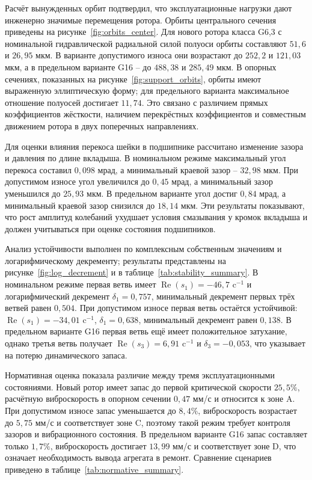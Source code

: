 Расчёт вынужденных орбит подтвердил, что эксплуатационные нагрузки дают инженерно значимые перемещения ротора. Орбиты центрального сечения приведены на рисунке~\ref{fig:orbits_center}. Для нового ротора класса G6,3 с номинальной гидравлической радиальной силой полуоси орбиты составляют $51{,}6$ и $26{,}95$ мкм. В варианте допустимого износа они возрастают до $252{,}2$ и $121{,}03$ мкм, а в предельном варианте G16 -- до $488{,}38$ и $285{,}49$ мкм. В опорных сечениях, показанных на рисунке~\ref{fig:support_orbits}, орбиты имеют выраженную эллиптическую форму; для предельного варианта максимальное отношение полуосей достигает $11{,}74$. Это связано с различием прямых коэффициентов жёсткости, наличием перекрёстных коэффициентов и совместным движением ротора в двух поперечных направлениях.

Для оценки влияния перекоса шейки в подшипнике рассчитано изменение зазора и давления по длине вкладыша. В номинальном режиме максимальный угол перекоса составил $0{,}098$ мрад, а минимальный краевой зазор -- $32{,}98$ мкм. При допустимом износе угол увеличился до $0{,}45$ мрад, а минимальный зазор уменьшился до $25{,}93$ мкм. В предельном варианте угол достиг $0{,}84$ мрад, а минимальный краевой зазор снизился до $18{,}14$ мкм. Эти результаты показывают, что рост амплитуд колебаний ухудшает условия смазывания у кромок вкладыша и должен учитываться при оценке состояния подшипников.

Анализ устойчивости выполнен по комплексным собственным значениям и логарифмическому декременту; результаты представлены на рисунке~\ref{fig:log_decrement} и в таблице~\ref{tab:stability_summary}. В номинальном режиме первая ветвь имеет $\operatorname{Re}(s_1)=-46{,}7$ c$^{-1}$ и логарифмический декремент $\delta_1=0{,}757$, минимальный декремент первых трёх ветвей равен $0{,}504$. При допустимом износе первая ветвь остаётся устойчивой: $\operatorname{Re}(s_1)=-34{,}01$ c$^{-1}$, $\delta_1=0{,}638$, минимальный декремент равен $0{,}138$. В предельном варианте G16 первая ветвь ещё имеет положительное затухание, однако третья ветвь получает $\operatorname{Re}(s_3)=6{,}91$ c$^{-1}$ и $\delta_3=-0{,}053$, что указывает на потерю динамического запаса.

Нормативная оценка показала различие между тремя эксплуатационными состояниями. Новый ротор имеет запас до первой критической скорости $25{,}5\%$, расчётную виброскорость в опорном сечении $0{,}47$ мм/с и относится к зоне A. При допустимом износе запас уменьшается до $8{,}4\%$, виброскорость возрастает до $5{,}75$ мм/с и соответствует зоне C, поэтому такой режим требует контроля зазоров и вибрационного состояния. В предельном варианте G16 запас составляет только $1{,}7\%$, виброскорость достигает $13{,}99$ мм/с и соответствует зоне D, что означает необходимость вывода агрегата в ремонт. Сравнение сценариев приведено в таблице~\ref{tab:normative_summary}.

